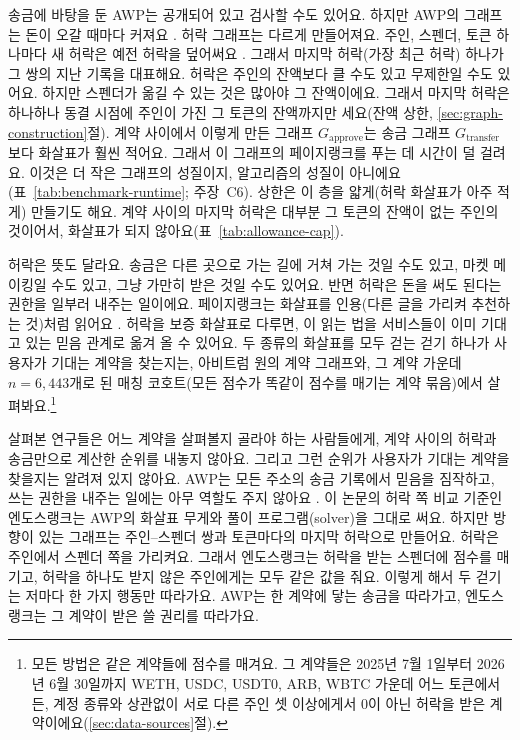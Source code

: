 송금에 바탕을 둔 AWP는 공개되어 있고 검사할 수도 있어요. 하지만 AWP의 그래프는 돈이 오갈 때마다 커져요 \parencite{do2023awp}. 허락 그래프는 다르게 만들어져요. 주인, 스펜더, 토큰 하나마다 새 허락은 예전 허락을 덮어써요 \parencite{vogelsteller2015erc20}. 그래서 마지막 허락(가장 최근 허락) 하나가 그 쌍의 지난 기록을 대표해요. 허락은 주인의 잔액보다 클 수도 있고 무제한일 수도 있어요. 하지만 스펜더가 옮길 수 있는 것은 많아야 그 잔액이에요. 그래서 마지막 허락은 하나하나 동결 시점에 주인이 가진 그 토큰의 잔액까지만 세요(잔액 상한, \ref{sec:graph-construction}절). 계약 사이에서 이렇게 만든 그래프 $G_{\text{approve}}$는 송금 그래프 $G_{\text{transfer}}$보다 화살표가 훨씬 적어요. 그래서 이 그래프의 페이지랭크를 푸는 데 시간이 덜 걸려요. 이것은 더 작은 그래프의 성질이지, 알고리즘의 성질이 아니에요(표~\ref{tab:benchmark-runtime}; 주장~C6). 상한은 이 층을 얇게(허락 화살표가 아주 적게) 만들기도 해요. 계약 사이의 마지막 허락은 대부분 그 토큰의 잔액이 없는 주인의 것이어서, 화살표가 되지 않아요(표~\ref{tab:allowance-cap}).

허락은 뜻도 달라요. 송금은 다른 곳으로 가는 길에 거쳐 가는 것일 수도 있고, 마켓 메이킹일 수도 있고, 그냥 가만히 받은 것일 수도 있어요. 반면 허락은 돈을 써도 된다는 권한을 일부러 내주는 일이에요. 페이지랭크는 화살표를 인용(다른 글을 가리켜 추천하는 것)처럼 읽어요 \parencite{page1999pagerank}. 허락을 보증 화살표로 다루면, 이 읽는 법을 서비스들이 이미 기대고 있는 믿음 관계로 옮겨 올 수 있어요. 두 종류의 화살표를 모두 걷는 걷기 하나가 사용자가 기대는 계약을 찾는지는, 아비트럼 원의 계약 그래프와, 그 계약 가운데 $n=6{,}443$개로 된 매칭 코호트(모든 점수가 똑같이 점수를 매기는 계약 묶음)에서 살펴봐요.\footnote{모든 방법은 같은 계약들에 점수를 매겨요. 그 계약들은 2025년 7월 1일부터 2026년 6월 30일까지 WETH, USDC, USDT0, ARB, WBTC 가운데 어느 토큰에서든, 계정 종류와 상관없이 서로 다른 주인 셋 이상에게서 0이 아닌 허락을 받은 계약이에요(\ref{sec:data-sources}절).}


살펴본 연구들은 어느 계약을 살펴볼지 골라야 하는 사람들에게, 계약 사이의 허락과 송금만으로 계산한 순위를 내놓지 않아요. 그리고 그런 순위가 사용자가 기대는 계약을 찾을지는 알려져 있지 않아요. AWP는 모든 주소의 송금 기록에서 믿음을 짐작하고, 쓰는 권한을 내주는 일에는 아무 역할도 주지 않아요 \parencite{do2023awp}. 이 논문의 허락 쪽 비교 기준인 엔도스랭크는 AWP의 화살표 무게와 풀이 프로그램(solver)을 그대로 써요. 하지만 방향이 있는 그래프는 주인--스펜더 쌍과 토큰마다의 마지막 허락으로 만들어요. 허락은 주인에서 스펜더 쪽을 가리켜요. 그래서 엔도스랭크는 허락을 받는 스펜더에 점수를 매기고, 허락을 하나도 받지 않은 주인에게는 모두 같은 값을 줘요. 이렇게 해서 두 걷기는 저마다 한 가지 행동만 따라가요. AWP는 한 계약에 닿는 송금을 따라가고, 엔도스랭크는 그 계약이 받은 쓸 권리를 따라가요.

